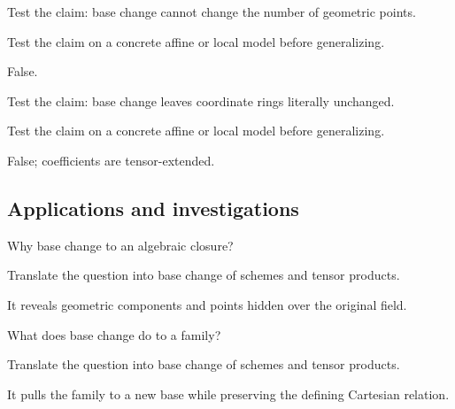 \begin{exercise}\label{exr:vi24-expand-11}
Test the claim: base change cannot change the number of geometric points.
\end{exercise}
\begin{hint}
Test the claim on a concrete affine or local model before generalizing.
\end{hint}
\begin{solution}
False.
\end{solution}

\begin{exercise}\label{exr:vi24-expand-12}
Test the claim: base change leaves coordinate rings literally unchanged.
\end{exercise}
\begin{hint}
Test the claim on a concrete affine or local model before generalizing.
\end{hint}
\begin{solution}
False; coefficients are tensor-extended.
\end{solution}

\subsection*{Applications and investigations}

\begin{exercise}\label{exr:vi24-expand-13}
Why base change to an algebraic closure?
\end{exercise}
\begin{hint}
Translate the question into base change of schemes and tensor products.
\end{hint}
\begin{solution}
It reveals geometric components and points hidden over the original field.
\end{solution}

\begin{exercise}\label{exr:vi24-expand-14}
What does base change do to a family?
\end{exercise}
\begin{hint}
Translate the question into base change of schemes and tensor products.
\end{hint}
\begin{solution}
It pulls the family to a new base while preserving the defining Cartesian relation.
\end{solution}

